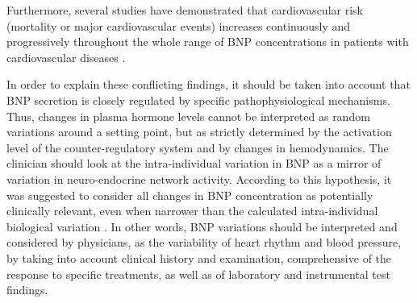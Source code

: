 \documentclass[14pt,a4paper,onecolumn]{extarticle}
\begin{document}
Furthermore, several studies have demonstrated that cardiovascular risk (mortality or major cardiovascular events) increases continuously and progressively throughout the whole range of BNP concentrations in patients with cardiovascular diseases \citep{bib35} \citep{bib377} \citep{bib378} \citep{bib3194}.

In order to explain these conflicting findings, it should be taken into account that BNP secretion is closely regulated by specific pathophysiological mechanisms. Thus, changes in plasma hormone levels cannot be interpreted as random variations around a setting point, but as strictly determined by the activation level of the counter-regulatory system and by changes in hemodynamics. The clinician should look at the intra-individual variation in BNP as a mirror of variation in neuro-endocrine network activity. According to this hypothesis, it was suggested to consider all changes in BNP concentration as potentially clinically relevant, even when narrower than the calculated intra-individual biological variation \citep{bib3103}.
In other words, BNP variations should be interpreted and considered by physicians, as the variability of heart rhythm and blood pressure, by taking into account clinical history and examination, comprehensive of the response to specific treatments, as well as of laboratory and instrumental test findings.

\end{document}

